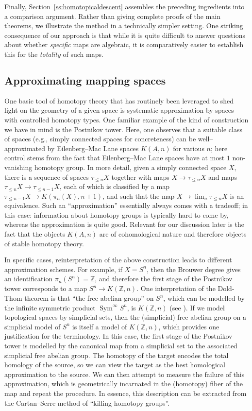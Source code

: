 \documentclass[11pt,leqno]{article}
\newcommand{\Z}{{\mathbb Z}}
\renewcommand{\1}{{\rm 1\hspace*{-0.4ex}%
\rule{0.1ex}{1.52ex}\hspace*{0.2ex}}}
\newcommand{\Sym}{{\operatorname{Sym}}}
\newcommand{\<}[1]{{\langle}#1 {\rangle}}
\theoremstyle{plain}
\theoremstyle{definition}
\theoremstyle{remark}
\numberwithin{equation}{subsection}
\begin{document}
Finally, Section~\ref{ss:homotopicaldescent} assembles the preceding ingredients into a comparison argument.  Rather than giving complete proofs of the main theorems, we illustrate the method in a technically simpler setting.  One striking consequence of our approach is that while it is quite difficult to answer questions about whether {\em specific} maps are algebraic, it is comparatively easier to establish this for the {\em totality} of such maps.

\subsection{Approximating mapping spaces}
\label{ss:approximatingspaces}
One basic tool of homotopy theory that has routinely been leveraged to shed light on the geometry of a given space is systematic approximation by spaces with controlled homotopy types.  One familiar example of the kind of construction we have in mind is the Postnikov tower.  Here, one observes that a suitable class of spaces (e.g., simply connected spaces for concreteness) can be well--approximated by Eilenberg--Mac Lane spaces $K(A,n)$ for various $n$; here control stems from the fact that Eilenberg--Mac Lane spaces have at most $1$ non-vanishing homotopy group.  In more detail, given a simply connected space $X$, there is a sequence of spaces $\tau_{\leq n} X$ together with maps $X \to \tau_{\leq n} X$ and maps $\tau_{\leq n}X \to \tau_{\leq n-1} X$, each of which is classified by a map $\tau_{\leq n-1} X \to K(\pi_n(X),n+1)$, and such that the map $X \to \lim_n \tau_{\leq n} X$ is an equivalence.  Such an ``approximation'' essentially always comes with a tradeoff; in this case: information about homotopy groups is typically hard to come by, whereas the approximation is quite good.  Relevant for our discussion later is the fact that the objects $K(A,n)$ are of cohomological nature and therefore objects of stable homotopy theory.  

In specific cases, reinterpretation of the above construction leads to different approximation schemes.  For example, if $X = S^n$, then the Brouwer degree gives an identification $\pi_n(S^n) = \Z$, and therefore the first stage of the Postnikov tower corresponds to a map $S^n \to K(\Z,n)$.  One interpretation of the Dold-Thom theorem is that ``the free abelian group'' on $S^n$, which can be modelled by the infinite symmetric product $\Sym^{\infty} S^n$, is $K(\Z,n)$ (see \cite{DoldThom1958}).  If we model topological spaces by simplicial sets, then the (simplicial) free abelian group on a simplicial model of $S^n$ is itself a model of $K(\Z,n)$, which provides one justification for the terminology.  In this case, the first stage of the Postnikov tower is modelled by the canonical map from a simplicial set to the associated simplicial free abelian group.  The homotopy of the target encodes the total homology of the source, so we can view the target as the best homological approximation to the source.  We can then attempt to measure the failure of this approximation, which is geometrically incarnated in the (homotopy) fiber of the map and repeat the procedure.  In essence, this description can be extracted from the Cartan--Serre method of ``killing homotopy groups''.
\end{document}
